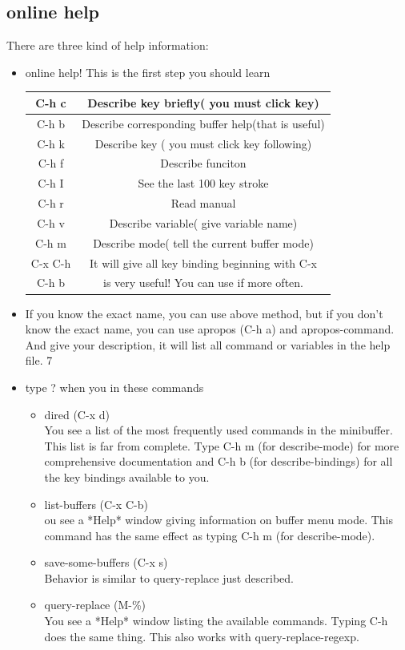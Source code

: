 \documentclass[a4paper,12pt,twoside]{book}
\begin{document}
\begin{CJK*}{UTF8}{song}
\subsection{online help}
There are three kind of help information:
	\begin{itemize}
	\item online help! This is the first step you should learn\\
		\begin{tabular}{|c|c|}
		\hline C-h c & Describe key briefly( you must click key) \\
		\hline C-h b & Describe corresponding buffer help(that is useful) \\
		\hline C-h k & Describe key ( you must click key following)\\
		\hline C-h f & Describe funciton\\
		\hline C-h I & See the last 100 key stroke\\
		\hline C-h r & Read manual \\
		\hline C-h v & Describe variable( give variable name)\\
		\hline C-h m& Describe mode( tell the current buffer mode)\\
		\hline C-x C-h& It will give all key binding beginning with C-x\\
		\hline C-h b &  is very useful! You can use if more often. \\
		\hline
		\end{tabular}
	\item If you know the exact name, you can use above method, but if you don't know the exact name, you can use apropos (C-h a) and apropos-command. And give your description, it will list all command or variables in the help file. 7
	\item type ? when you in these commands
		\begin{itemize}
		\item dired (C-x d) \\
			You see a list of the most frequently used commands in the minibuffer. This list is far from complete. Type C-h m (for describe-mode) for more comprehensive documentation and C-h b (for describe-bindings) for all
 the key bindings available to you.
		\item list-buffers (C-x C-b) \\
			ou see a *Help* window giving information on buffer menu mode. This command has the same effect as typing C-h m (for describe-mode).
		\item save-some-buffers (C-x s) \\
			Behavior is similar to query-replace just described.
		\item query-replace (M-\%)  \\
		You see a *Help* window listing the available commands. Typing C-h does the same thing. This also works with query-replace-regexp.
		\end{itemize}
	\end{itemize}

\end{CJK*}
\end{document}
